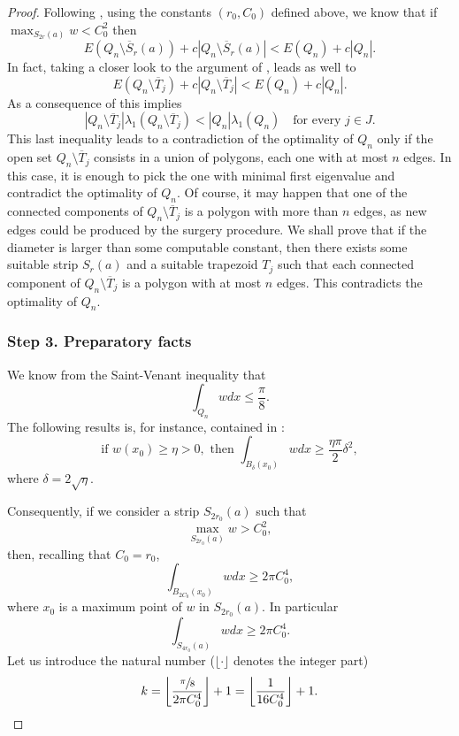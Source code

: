 \documentclass[11pt]{article}
\numberwithin{equation}{section}\newtheorem*{jepEnonce}{\jepEnonceTitle}\newenvironment{enonce*}[1]{\def\jepEnonceTitle{#1}\jepEnonce}{\endjepEnonce}\newtheorem*{conj*}{Conjecture}
\theoremstyle{plain}
\theoremstyle{definition}
\newcommand{\lb}{\lambda}
\newcommand{\sm}{\setminus}
\newcommand{\ov}{\overline}
\let\jepOriginalSfrac\sfrac
\renewcommand{\sfrac}[2]{{\jepOriginalSfrac{#1}{#2}}}
\begin{document}
\begin{proof}
Following \cite[Cor.\,4.3]{BuMa15}, using the constants $(r_0, C_0)$ defined above, we know that
if $\max_{S_{2r}(a) } w <C_0^2$ then
\begin{equation}\label{bb62}
E(Q_n\sm \ov S_{r}(a))+c |Q_n\sm \ov S_{r}(a)|< E(Q_n)+c |Q_n|.
\end{equation}
In fact, taking a closer look to the argument of \cite[Cor.\,4.3]{BuMa15}, leads as well to
\begin{equation}\label{bb62.5}
E(Q_n\sm \ov T_j)+c |Q_n\sm \ov T_j|< E(Q_n)+c |Q_n|.
\end{equation}
As a consequence of \cite[Lem.\,3.1]{BuMa15} this implies
\[
|Q_n\sm \ov T_j|\lb_1(Q_n\sm \ov T_j) < |Q_n| \lb_1(Q_n) \quad\text{for every } j \in J.
\]
This last inequality leads to a contradiction of the optimality of $Q_n$ only if the open set $Q_n\sm \ov T_j$ consists in a union of polygons, each one with at most $n$ edges. In this case, it is enough to pick the one with minimal first eigenvalue and contradict the optimality of $Q_n$. Of course, it may happen that one of the connected components of $Q_n\sm \ov T_j$ is a polygon with more than $n$ edges, as new edges could be produced by the surgery procedure. We shall prove that if the diameter is larger than some computable constant, then there exists some suitable strip $S_{r}(a)$ and a suitable {trapezoid} $T_j$ such that each connected component of $Q_n\sm \ov T_j$ is a polygon with at most $n$ edges. This contradicts the optimality of $Q_n$.

\subsubsection*{Step 3. Preparatory facts} We know from the Saint-Venant inequality \cite{Ma66} that
\[
\int_{Q_n} w dx \le \frac{\pi}{8}.
\]
The following results is, for instance, contained in \cite[Lem.\,2.2]{BuMa15}:
\[
\text{if } w(x_0) \ge \eta >0, \text{ then } \int _{B_\delta (x_0)} w dx\ge \frac{\eta \pi}{2} \delta^2,
\]
where $\delta = 2 \sqrt{\eta}$.

Consequently, if we consider a strip $S_{2r_0}(a)$ such that
\[
\max _{S_{2r_0}(a)} w >C_0^2,
\]
then, recalling that $C_0=r_0$,
\[
\int_{B_{2C_0} (x_0)} w dx \ge 2\pi C_0^4,
\]
where $x_0$ is a maximum point of $w$ in $S_{2r_0}(a)$. In particular
\[
\int_{S_{4r_0}(a)} w dx \ge 2\pi C_0^4.
\]
Let us introduce the natural number ($\lfloor \cdot \rfloor$ denotes the integer part)
\[
k= \left\lfloor\frac{\sfrac {\pi}{8}}{2\pi C_0^4}\right \rfloor +1= \left \lfloor\frac{1}{16C_0^4}\right \rfloor +1.
\]


\end{proof}
\end{document}
